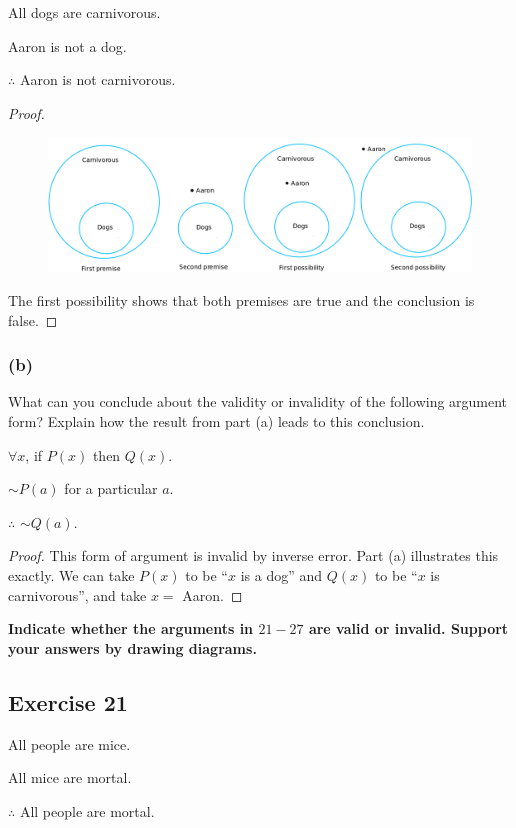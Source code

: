 \documentclass[14pt]{extarticle}
\newcommand{\fa}{\forall}
\begin{document}
All dogs are carnivorous.

Aaron is not a dog.

$\therefore$ Aaron is not carnivorous.

\begin{proof}
\begin{figure}[ht!]
\centering
\includegraphics[scale=0.3]{../images/3.4.20.png}
\end{figure}
The first possibility shows that both premises are true and the conclusion is false.
\end{proof}

\subsubsection{(b)}
What can you conclude about the validity or invalidity of the following argument form? Explain how the result from part (a) leads to this conclusion.

$\fa x$, if $P(x)$ then $Q(x)$.

$\sim P(a)$ for a particular $a$.

$\therefore$ $\sim Q(a)$.

\begin{proof}
This form of argument is invalid by inverse error. Part (a) illustrates this exactly. We can take $P(x)$ to be ``$x$ is a dog'' and $Q(x)$ to be ``$x$ is carnivorous'', and take $x =$ Aaron.
\end{proof}

{\bf \color{cyan} Indicate whether the arguments in $21-27$ are valid or invalid. Support your answers by drawing diagrams.}

\subsection{Exercise 21}
All people are mice.

All mice are mortal.

$\therefore$ All people are mortal.
\end{document}
